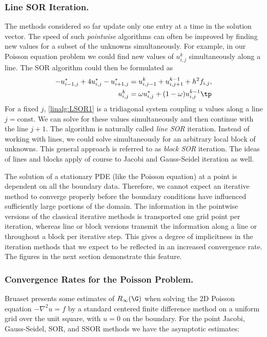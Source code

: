 \subsubsection{Line SOR Iteration.}
The methods considered so far update only one entry at a time in
the solution vector. The speed of such \emph{pointwise} algorithms
can often be improved by finding new values for a subset of
the unknowns {simultaneously}. For example, in our Poisson equation
problem we could find new values of $u_{i,j}^{k}$ simultaneously
along a line. The SOR algorithm could then be formulated as
\begin{align}
 -u_{i-1,j}^* + 4u_{i,j}^* - u_{i+1,j}^* &= u_{i,j-1}^{k}
+ u_{i,j+1}^{k-1} + h^2f_{i,j},\label{linalg:LSOR1}\\
u_{i,j}^{k} &= \omega u_{i,j}^* + (1-\omega )u_{i,j}^{k-1} \tp
\end{align}
For a fixed $j$, \eqref{linalg:LSOR1} is a tridiagonal system coupling
$u$ values along a line $j=\mbox{const}$. We can solve for these
values simultaneously and then continue with the line $j+1$.
The algorithm is naturally called \emph{line SOR} iteration.
Instead of working with lines, we could solve simultaneously for
an arbitrary local block of unknowns.
This general approach is referred to as \emph{block SOR} iteration.
The ideas of lines and blocks apply of course to Jacobi and
Gauss-Seidel iteration as well.

The solution of a stationary PDE (like the Poisson equation)
at a point is dependent on all the boundary
data. Therefore, we cannot expect an iterative method to converge properly
before the boundary conditions have influenced sufficiently large portions
of the domain. The information in the pointwise versions of the
classical iterative methods is transported one grid point per iteration,
whereas
line or block versions transmit the information along a line
or throughout a block per iterative step.
This gives a degree of implicitness in the iteration methods that we expect
to be reflected in an increased convergence rate.
The figures in the next section demonstrate this feature.


\subsubsection{Convergence Rates for the Poisson Problem.}
Bruaset \cite{BruBok} presents some estimates of
$R_{\infty}(\G )$ when solving the 2D Poisson equation $-\nabla^2u =f$
by a standard centered finite difference method on a uniform grid over
the unit square, with $u=0$ on the boundary.
For the point Jacobi, Gauss-Seidel, SOR, and SSOR methods we have the
asymptotic estimates:\label{ch:linalg:SORconv}

